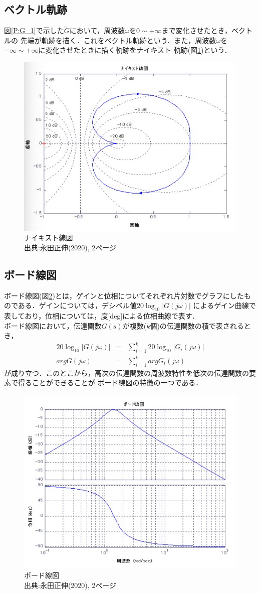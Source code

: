\documentclass[a4paper,11pt]{jsarticle}
\begin{document}
\subsection{ベクトル軌跡}
図\ref{P:G_1}で示した$\overleftrightarrow{G}$において，周波数$\omega$を$0\sim +\infty$まで変化させたとき，ベクトルの
先端が軌跡を描く．これをベクトル軌跡という．また，周波数$\omega$を$-\infty \sim +\infty$に変化させたときに描く軌跡をナイキスト
軌跡(図\ref{P:G_2})という．
\begin{figure}[H]
  \centering
  \includegraphics[width=0.5\linewidth]{picture/G_2.png}
  \caption{ナイキスト線図\\出典:永田正伸(2020), 2ページ\cite{text}}
  \label{P:G_2}
\end{figure}

\subsection{ボード線図}
ボード線図(図\ref{P:G_3})とは，ゲインと位相についてそれぞれ片対数でグラフにしたものである．ゲインについては，デシベル値$20\log_{10}|G(j\omega)|$
によるゲイン曲線で表しており，位相については，度[deg]による位相曲線で表す．\\
ボード線図において，伝達関数$G(s)$が複数($k$個)の伝達関数の積で表されるとき，
\begin{eqnarray}
  20\log_{10}|G(j\omega)| &=& \sum_{i=1}^{k}20\log_{10}|G_i(j\omega)| \\
  argG(j\omega) &=& \sum_{i=1}^{k}argG_i(j\omega)
\end{eqnarray}
が成り立つ．このとこから，高次の伝達関数の周波数特性を低次の伝達関数の要素で得ることができることが
ボード線図の特徴の一つである．
\begin{figure}[H]
  \centering
  \includegraphics[width=0.5\linewidth]{picture/G_3.png}
  \caption{ボード線図\\出典:永田正伸(2020), 2ページ\cite{text}}
  \label{P:G_3}
\end{figure}
\end{document}
